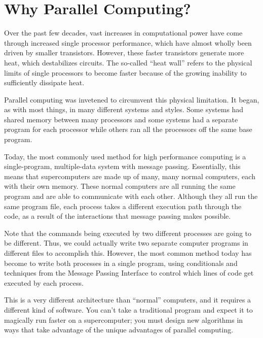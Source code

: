 \label{lab:MPI_Intro}

\section*{Why Parallel Computing?}
Over the past few decades, vast increases in computational power have come through
increased single processor performance, which have almost wholly been driven by smaller transistors.
However, these faster transistors generate more heat, which destabilizes circuits.
The so-called ``heat wall'' refers to the physical limits of single processors to
become faster because of the growing inability to sufficiently dissipate heat.

Parallel computing was invetened to circumvent this physical limitation.
It began, as with most things, in many different systems and styles.
Some systems had shared memory between many processors and some systems had a separate
program for each processor while others ran all the processors off the same base program.

Today, the most commonly used method for high performance computing is a single-program,
multiple-data system with message passing.
Essentially, this means that supercomputers are made up of many, many normal computers, each with their own memory.
These normal computers are all running the same program and are able to communicate with each other. Although they all run the same program file, each process takes a different execution path through the code, as a result of the interactions that message passing makes possible.

Note that the commands being executed by two different processes are going to be different.
Thus, we could actually write two separate computer programs in different files to accomplish this.
However, the most common method today has become to write both processes in a single program,
using conditionals and techniques from the Message Passing Interface to control which lines of code get executed by each process.

This is a very different architecture than ``normal'' computers, and it requires a
different kind of software. You can't take a traditional program and expect it to
magically run faster on a supercomputer; you must design new algorithms in ways that take advantage of the unique advantages of parallel computing.

